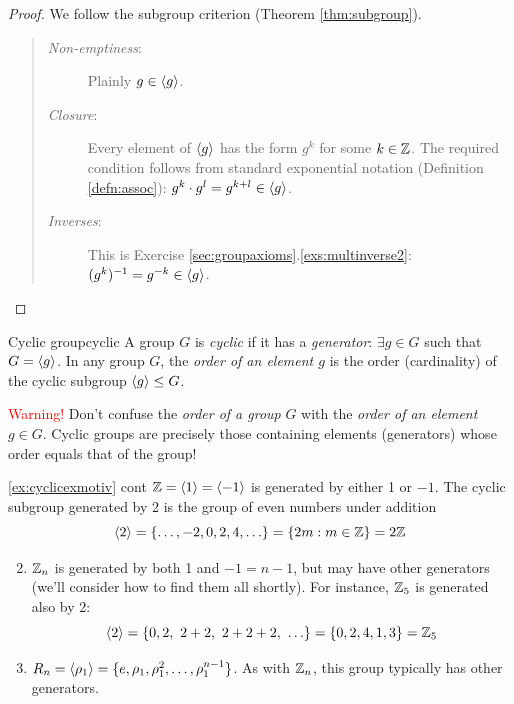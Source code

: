 \begin{proof}
	We follow the subgroup criterion (Theorem \ref{thm:subgroup}).
	\begin{quote}
		\begin{description}
			\item[\emph{Non-emptiness}:] Plainly $g\in\left\langle g\right\rangle$.
			\item[\emph{Closure}:] Every element of $\left\langle g\right\rangle$ has the form $g^k$ for some $k\in \mathbb{Z}$. The required condition follows from standard exponential notation (Definition \ref{defn:assoc}): $g^k\cdot g^l=g^{k+l}\in\left\langle g\right\rangle$.
			\item[\emph{Inverses}:] This is Exercise \ref*{sec:groupaxioms}.\ref{exs:multinverse2}: $(g^k)^{-1}=g^{-k}\in\left\langle g\right\rangle$.
		\end{description}
	\end{quote}
	\vspace{-18pt}
\end{proof}

\begin{defn}{Cyclic group}{cyclic}
	A group $G$ is \emph{cyclic} if it has a \emph{generator}: $\exists g\in G$ such that $G=\left\langle g\right\rangle$.\smallbreak
	In any group $G$, the \emph{order of an element $g$} is the order (cardinality) of the cyclic subgroup $\left\langle g\right\rangle\le G$.
\end{defn}

\textcolor{red}{Warning!} Don't confuse the \emph{order of a group} $G$ with the \emph{order of an element} $g\in G$. Cyclic groups are precisely those containing elements (generators) whose order equals that of the group!


\goodbreak


\begin{examples*}{\ref{ex:cyclicexmotiv} cont}{}
	\exstart $\mathbb{Z}=\left\langle 1\right\rangle=\left\langle -1\right\rangle$ is generated by either 1 or $-1$. The cyclic subgroup generated by 2 is the group of even numbers under addition
	\[
		\left\langle 2\right\rangle=\{\ldots,-2,0,2,4,\ldots\}=\{2m:m\in\mathbb{Z}\}=2\mathbb{Z}
	\]
	\begin{enumerate}\setcounter{enumi}{1}
	  \item $\mathbb{Z}_n$ is generated by both 1 and $-1=n-1$, but may have other generators (we'll consider how to find them all shortly). For instance, $\mathbb{Z}_5$ is generated also by 2:
	  \[
	  	\ip 2=\{0, 2,\ 2+2,\ 2+2+2,\ \ldots\}=\{0, 2, 4, 1, 3\} =\Z_5
	  \]
		\item $R_n=\left\langle \rho_1\right\rangle=\{e,\rho_1,\rho_1^2,\ldots,\rho_1^{n-1}\}$. As with $\mathbb{Z}_n$, this group typically has other generators.
	\end{enumerate}
\end{examples*}


